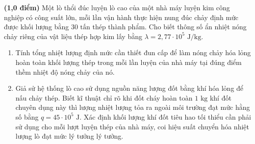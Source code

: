 \begin{ex}%
	\textbf{(1,0 điểm)} Một lò thổi đúc luyện lò cao của một nhà máy luyện kim công nghiệp có công suất lớn, mỗi lần vận hành thực hiện nung đúc chảy định mức được khối lượng bằng $30\text{ tấn}$ thép thành phẩm. Cho biết thông số ẩn nhiệt nóng chảy riêng của vật liệu thép hợp kim lấy bằng $\lambda = 2,77 \cdot 10^5\text{ J/kg}$.
	\begin{enumerate}
		\item[a.] Tính tổng nhiệt lượng định mức cần thiết đun cấp để làm nóng chảy hóa lỏng hoàn toàn khối lượng thép trong mỗi lần luyện của nhà máy tại đúng điểm thềm nhiệt độ nóng chảy của nó.
		\item[b.] Giả sử hệ thống lò cao sử dụng nguồn năng lượng đốt bằng khí hóa lỏng để nấu chảy thép. Biết kĩ thuật chỉ rõ khi đốt cháy hoàn toàn $1\text{ kg}$ khí đốt chuyên dụng này thì lượng nhiệt lượng tỏa ra ngoài môi trường đạt mức hằng số bằng $q = 45 \cdot 10^5\text{ J}$. Xác định khối lượng khí đốt tiêu hao tối thiểu cần phải sử dụng cho mỗi lượt luyện thép của nhà máy, coi hiệu suất chuyển hóa nhiệt lượng lò đạt mức lý tưởng lý tưởng.
	\end{enumerate}
\end{ex}

